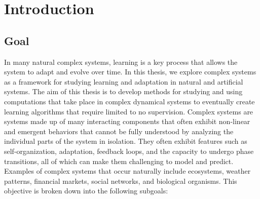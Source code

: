 \chapter{Introduction}
\label{cha:introduction}

\section{Goal}

In many natural complex systems, learning is a key process that allows the
system to adapt and evolve over time. 
In this thesis, we explore complex systems
as a framework for studying learning and adaptation in natural and artificial
systems. The aim of this thesis is to develop methods for studying and using
computations that take place in complex dynamical systems to eventually create
learning algorithms that require limited to no supervision. 
Complex systems are systems made up of many interacting components that often 
exhibit non-linear and emergent behaviors that cannot be fully understood by 
analyzing the individual parts of the system in isolation. They often exhibit 
features such as self-organization, adaptation, feedback loops, and the capacity
to undergo phase transitions, all of which can make them challenging to model and 
predict. Examples of complex systems that occur naturally include ecosystems, weather patterns, financial 
markets, social networks, and biological organisms.
This objective is broken down into the following subgoals:

